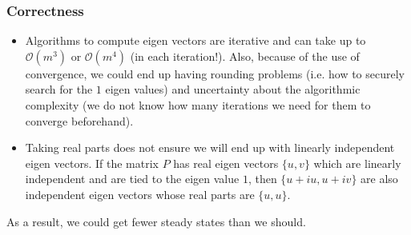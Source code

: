 \begin{frame} \frametitle{Correctness}
\begin{itemize}
 \item Algorithms to compute eigen vectors are iterative and can take up to 
 $\mathcal{O}(m^3)$ or $\mathcal{O}(m^4)$ (in each iteration!). Also, because of 
 the use of convergence, we could end up having rounding problems (i.e. how 
 to securely search for the $1$ eigen values) and uncertainty about the 
 algorithmic complexity (we do not know how many iterations we need for them to converge beforehand).
 \item Taking real parts does not ensure we will end up with linearly independent eigen vectors. If the matrix $P$ has real eigen vectors $\{u, v\}$ which are linearly independent and are tied to the eigen value $1$, then $\{u + iu, u + iv\}$ are also independent eigen vectors whose real parts are $\{u,u\}$. 
\end{itemize}

\bigskip
As a result, we could get fewer steady states than we should.
\end{frame}


